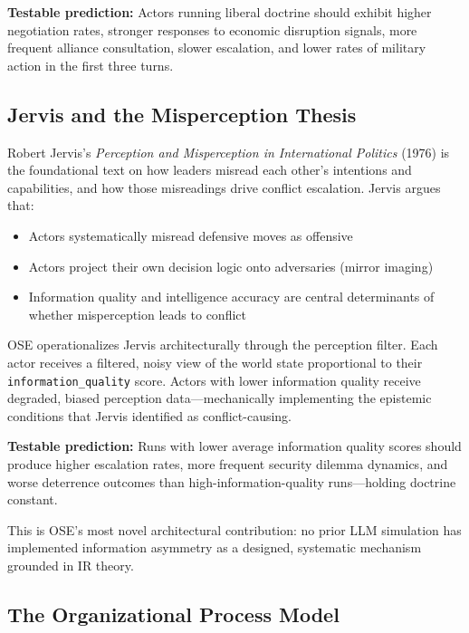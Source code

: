 \documentclass[12pt, a4paper]{article}
\begin{document}
\textbf{Testable prediction:} Actors running liberal doctrine should exhibit higher negotiation rates, stronger responses to economic disruption signals, more frequent alliance consultation, slower escalation, and lower rates of military action in the first three turns.

\subsection{Jervis and the Misperception Thesis}

Robert Jervis's \textit{Perception and Misperception in International Politics} (1976) is the foundational text on how leaders misread each other's intentions and capabilities, and how those misreadings drive conflict escalation. Jervis argues that:
\begin{itemize}[leftmargin=1.5em]
    \item Actors systematically misread defensive moves as offensive
    \item Actors project their own decision logic onto adversaries (mirror imaging)
    \item Information quality and intelligence accuracy are central determinants of whether misperception leads to conflict
\end{itemize}

OSE operationalizes Jervis architecturally through the perception filter. Each actor receives a filtered, noisy view of the world state proportional to their \texttt{information\_quality} score. Actors with lower information quality receive degraded, biased perception data---mechanically implementing the epistemic conditions that Jervis identified as conflict-causing.

\textbf{Testable prediction:} Runs with lower average information quality scores should produce higher escalation rates, more frequent security dilemma dynamics, and worse deterrence outcomes than high-information-quality runs---holding doctrine constant.

This is OSE's most novel architectural contribution: no prior LLM simulation has implemented information asymmetry as a designed, systematic mechanism grounded in IR theory.

\subsection{The Organizational Process Model}
\end{document}
